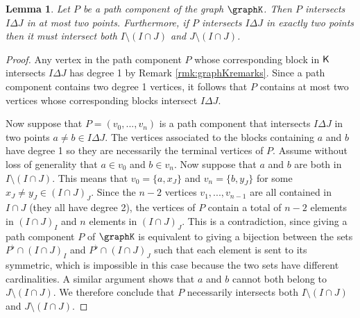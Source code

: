 \documentclass[11pt, a4paper, oneside, reqno]{amsart}
\newtheorem{lemma}[theorem]{Lemma}
\theoremstyle{remark}
\theoremstyle{definition}
\numberwithin{equation}{section}
\begin{document}
\begin{lemma}\label{lem:componentsGK}
	Let $P$ be a path component of the graph $\graphK$. Then $P$ intersects $I \Delta J$ in at most two points. Furthermore, if $P$ intersects $I \Delta J$ in exactly two points then it must intersect both $I \setminus (I\cap J)$ and $J \setminus (I\cap J)$.
\end{lemma}
\begin{proof}
	Any vertex in the path component $P$ whose corresponding block in ${\sf K}$ intersects $I\Delta J$ has degree 1 by Remark \ref{rmk:graphKremarks}.  Since a path component contains two degree 1 vertices, it follows that $P$ contains at most two vertices whose corresponding blocks intersect $I \Delta J$.
    
    Now suppose that $P = (v_0,...,v_n)$ is a path component that intersects $I\Delta J$ in two points $a\neq b \in I\Delta J$. The vertices associated to the blocks containing $a$ and $b$ have degree 1 so they are necessarily the terminal vertices of $P$. Assume without loss of generality that $a \in v_0$ and $b \in v_n$. Now suppose that $a$ and $b$ are both in $I \setminus (I \cap J)$. This means that $v_0 = \{a,x_J\}$ and $v_n = \{b,y_J\}$ for some $x_J \neq y_J \in (I\cap J)_J$. Since the $n-2$ vertices $v_1,...,v_{n-1}$ are all contained in $I \cap J$ (they all have degree 2), the vertices of $P$ contain a total of $n-2$ elements in $(I \cap J)_I$ and $n$ elements in $(I\cap J)_J$. This is a contradiction, since giving a path component $P$ of $\graphK$ is equivalent to giving a bijection between the sets $P^\flat \cap (I\cap J)_I$ and $P^\flat \cap (I\cap J)_J$ such that each element is sent to its symmetric, which is impossible in this case because the two sets have different cardinalities. A similar argument shows that $a$ and $b$ cannot both belong to $J \setminus (I\cap J)$. We therefore conclude that $P$ necessarily intersects both $I \setminus (I \cap J)$ and $J \setminus (I \cap J)$.
\end{proof}
\end{document}
